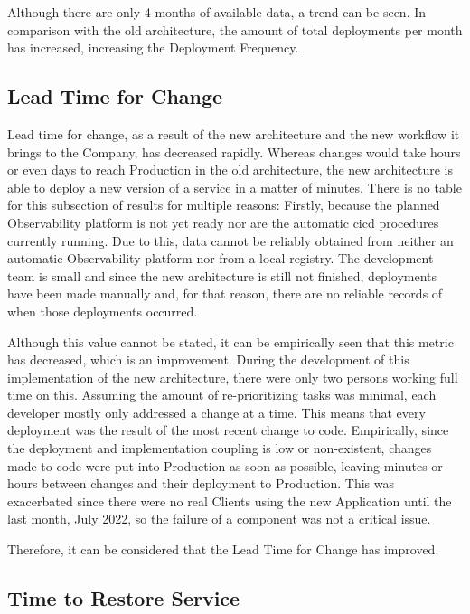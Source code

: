 

Although there are only 4 months of available data, a trend can be seen. In comparison with the old architecture, the amount of total deployments per month has increased, increasing the Deployment Frequency.

\subsection{Lead Time for Change}\label{results-and-discussion:ss:lead-time-for-change}

Lead time for change, as a result of the new architecture and the new workflow it brings to the Company, has decreased rapidly. Whereas changes would take hours or even days to reach Production in the old architecture, the new architecture is able to deploy a new version of a service in a matter of minutes. There is no table for this subsection of results for multiple reasons:
Firstly, because the planned Observability platform is not yet ready nor are the automatic \gls{cicd} procedures currently running. Due to this, data cannot be reliably obtained from neither an automatic Observability platform nor from a local registry. The development team is small and since the new architecture is still not finished, deployments have been made manually and, for that reason, there are no reliable records of when those deployments occurred. 

Although this value cannot be stated, it can be empirically seen that this metric has decreased, which is an improvement. During the development of this implementation of the new architecture, there were only two persons working full time on this. Assuming the amount of re-prioritizing tasks was minimal, each developer mostly only addressed a change at a time. This means that every deployment was the result of the most recent change to code. Empirically, since the deployment and implementation coupling is low or non-existent, changes made to code were put into Production as soon as possible, leaving minutes or hours between changes and their deployment to Production. This was exacerbated since there were no real Clients using the new Application until the last month, July 2022, so the failure of a component was not a critical issue.

Therefore, it can be considered that the Lead Time for Change has improved.

\subsection{Time to Restore Service}\label{results-and-discussion:ss:Time to Restore Service}

